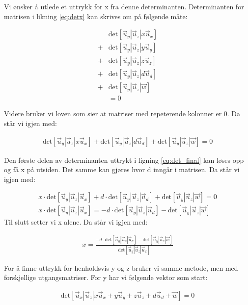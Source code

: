 Vi ønsker å utlede et uttrykk for x fra denne determinanten. Determinanten for matrisen i likning \ref{eq:detx} kan skrives om på følgende måte: 

\begin{align}
	&\text{det}[\vec{u}_y|\vec{u}_z | x\vec{u}_x] \nonumber
	\\+ &\text{det}[\vec{u}_y|\vec{u}_z | y\vec{u}_y] \nonumber
	\\+ &\text{det}[\vec{u}_y|\vec{u}_z | z\vec{u}_z] \nonumber
	 \\+&\text{det}[\vec{u}_y|\vec{u}_z | d\vec{u}_d] \nonumber
	\\+ &\text{det}[\vec{u}_y|\vec{u}_z | \vec{w}]\nonumber
	\\&=0
\end{align}

Videre bruker vi loven som sier at matriser med repeterende kolonner er 0. Da står vi igjen med: 

\begin{align} \label{eq:det_final}
	\text{det}[\vec{u}_y|\vec{u}_z | x\vec{u}_x] 
	+ \text{det}[\vec{u}_y|\vec{u}_z | d\vec{u}_d] 
	+ \text{det}[\vec{u}_y|\vec{u}_z | \vec{w}]
	=0
\end{align}

Den første delen av determinanten uttrykt i ligning \ref{eq:det_final} kan løses opp og få x på utsiden. Det samme kan gjøres hvor d inngår i matrisen. Da står vi igjen med: 

\begin{align}
	x\cdot\text{det}[\vec{u}_y|\vec{u}_z | \vec{u}_x] 
	+ d\cdot\text{det}[\vec{u}_y|\vec{u}_z | \vec{u}_d] 
	+ \text{det}[\vec{u}_y|\vec{u}_z | \vec{w}]
	=0 \nonumber 
	\\ 
	x\cdot\text{det}[\vec{u}_y|\vec{u}_z | \vec{u}_x] 
	= -d\cdot\text{det}[\vec{u}_y|\vec{u}_z | \vec{u}_d] 
	-\text{det}[\vec{u}_y|\vec{u}_z | \vec{w}]\nonumber 
\end{align}
Til slutt setter vi x alene. Da står vi igjen med: 

\begin{align}
    x=\frac{-d\cdot\text{det}[\vec{u}_y|\vec{u}_z | \vec{u}_d] 
	-\text{det}[\vec{u}_y|\vec{u}_z | \vec{w}]}{\text{det}[\vec{u}_y|\vec{u}_z | \vec{u}_x]}
\end{align}

For å finne uttrykk for henholdsvis y og z bruker vi samme metode, men med forskjellige utgangsmatriser. For y har vi følgende vektor som start: 

\begin{align} \label{eq:detx}
	\text{det}[\vec{u}_x|\vec{u}_z |x\vec{u}_x + y\vec{u}_y + z\vec{u}_z + d\vec{u}_d + \vec{w}]=0
\end{align}

